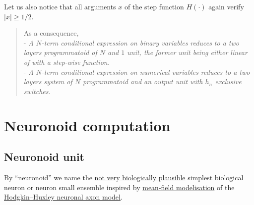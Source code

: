 \documentclass[a4]{article}
\newcommand{\tab}{\hphantom{4mm}}
\begin{document}
Let us also notice that all arguments $x$ of the step function $H(\cdot)$ again verify $|x| \ge 1/2$.

\begin{quotation}
As a consequence,
\\\tab - {\em A $N$-term conditional expression on binary variables reduces to a two layers programmatoid of $N$ and $1$ unit, the former unit being either linear of with a step-wise function.}
\\ \tab - {\em A $N$-term conditional expression on numerical variables reduces to a  two layers system of $N$ programmatoid and an output unit with $h_n$ exclusive switches.}
\end{quotation}
  
\section{Neuronoid computation} \label{neuronoid}

\subsection{Neuronoid unit}

By ``neuronoid'' we name the \href{https://en.wikipedia.org/wiki/Biological_neuron_model#Relation_between_artificial_and_biological_neuron_models}{not very biologically plausible} simplest biological neuron or neuron small ensemble inspired by \href{https://inria.hal.science/cel-01095603v1}{mean-field modelisation} of the \href{https://en.wikipedia.org/wiki/Hodgkin-Huxley_model}{Hodgkin–Huxley neuronal axon model}.
\end{document}

